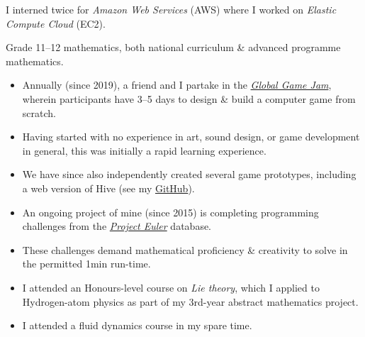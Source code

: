 \documentclass[10pt,a4paper,ragged2e,withhyper]{altacv}
\begin{document}
\begin{paracol}{2}
\divider %

\smallskip
I interned twice for \textit{Amazon Web Services} (AWS) where I worked on \textit{Elastic Compute Cloud} (EC2).

\divider %

\smallskip
Grade 11--12 mathematics, both national curriculum \& advanced programme mathematics.

\medskip

\begin{itemize}
\item Annually (since 2019), a friend and I partake in the
	\href{https://globalgamejam.org/about}{\emph{Global Game Jam}}, wherein participants have 3--5 days to design
	\& build a computer game from scratch.
\item Having started with no experience in art, sound design, or game development in general, this was
	initially a rapid learning experience.
\item We have since also independently created several game prototypes, including a web version of Hive
	(see my \href{https://github.com/dariotrinchero}{GitHub}).
\end{itemize}
\smallskip

\begin{itemize}
\item An ongoing project of mine (since 2015) is completing programming challenges from the
	\href{https://projecteuler.net/about}{\emph{Project Euler}} database.
\item These challenges demand mathematical proficiency \& creativity to solve in the permitted 1min run-time.
\end{itemize}
\smallskip

\begin{itemize}
\item I attended an Honours-level course on \textit{Lie theory}, which I applied to Hydrogen-atom physics as
	part of my 3rd-year abstract mathematics project.
\item I attended a fluid dynamics course in my spare time.
\end{itemize}
\smallskip


\end{paracol}
\end{document}
